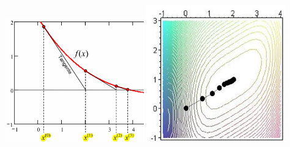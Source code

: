   \begin{minipage}{6cm}
  	\includegraphics[width=6cm]{./Content/NonLinearOptimization/Newton1D.png}
    \includegraphics[width=6cm]{./Content/NonLinearOptimization/newton.png}
  \end{minipage}
  
  
